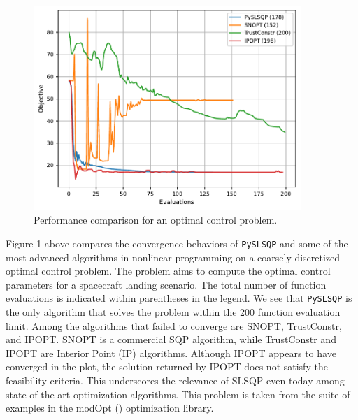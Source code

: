 \documentclass[
]{article}
\begin{document}
\begin{figure}
\centering
\includegraphics[width=0.9\textwidth,height=\textheight]{starship_20_jax-objective-cb.pdf}
\caption{Performance comparison for an optimal control problem.}
\end{figure}

Figure 1 above compares the convergence behaviors of \texttt{PySLSQP}
and some of the most advanced algorithms in nonlinear programming on a
coarsely discretized optimal control problem. The problem aims to
compute the optimal control parameters for a spacecraft landing
scenario. The total number of function evaluations is indicated within
parentheses in the legend. We see that \texttt{PySLSQP} is the only
algorithm that solves the problem within the 200 function evaluation
limit. Among the algorithms that failed to converge are SNOPT,
TrustConstr, and IPOPT. SNOPT is a commercial SQP algorithm, while
TrustConstr and IPOPT are Interior Point (IP) algorithms. Although IPOPT
appears to have converged in the plot, the solution returned by IPOPT
does not satisfy the feasibility criteria. This underscores the
relevance of SLSQP even today among state-of-the-art optimization
algorithms. This problem is taken from the suite of examples in the
modOpt () optimization library.
\end{document}

